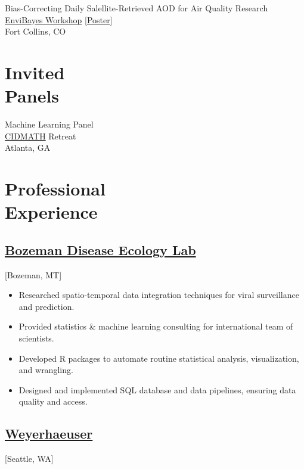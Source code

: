 \documentclass{wm_cv}
\begin{document}
Bias-Correcting Daily Salellite-Retrieved AOD for Air Quality Research \hfill {}\\
\indent \quad \href{https://statistics.colostate.edu/envibayes-workshop/}{EnviBayes Workshop} [\href{https://www.wyattgmadden.com/files/posters/20230918envibayes/envibayes2023.pdf}{Poster}] \\ 
   \indent \quad Fort Collins, CO \\

\section{Invited \\ Panels}

Machine Learning Panel \hfill {} \\
    \indent \quad \href{https://www.cidmath.org/}{CIDMATH} Retreat \\
   \indent \quad Atlanta, GA \\

\section{Professional \\ Experience}
\subsection{\href{http://bzndiseaselab.org/}{Bozeman Disease Ecology Lab}}[Bozeman, MT]
\begin{positions}
\end{positions}

\begin{itemize}
  \item Researched spatio-temporal data integration techniques for viral surveillance and prediction.
  \item Provided statistics \& machine learning consulting for international team of scientists.
  \item Developed R packages to automate routine statistical analysis, visualization, and wrangling.
  \item Designed and implemented SQL database and data pipelines, ensuring data quality and access.
\end{itemize}


\subsection{\href{https://en.wikipedia.org/wiki/Weyerhaeuser}{Weyerhaeuser}}[Seattle, WA]
\begin{positions}
\end{positions}
\end{document}
